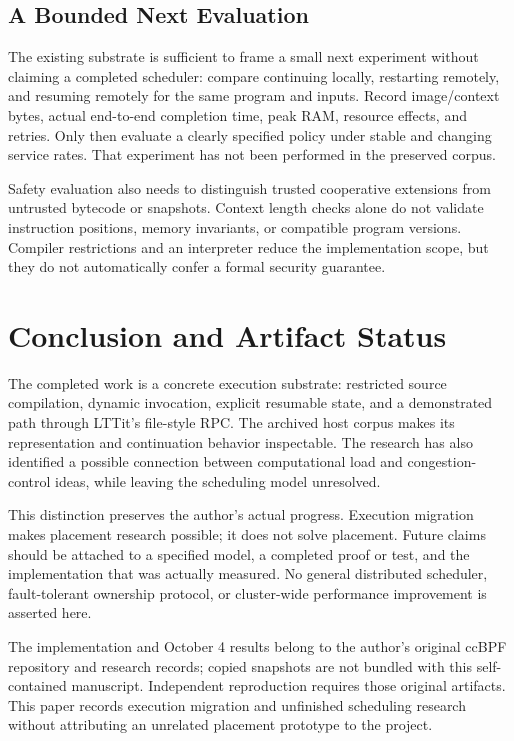 \documentclass[conference,letterpaper]{IEEEtran}
\begin{document}
\subsection{A Bounded Next Evaluation}
The existing substrate is sufficient to frame a small next experiment without claiming a completed scheduler: compare continuing locally, restarting remotely, and resuming remotely for the same program and inputs. Record image/context bytes, actual end-to-end completion time, peak RAM, resource effects, and retries. Only then evaluate a clearly specified policy under stable and changing service rates. That experiment has not been performed in the preserved corpus.

Safety evaluation also needs to distinguish trusted cooperative extensions from untrusted bytecode or snapshots. Context length checks alone do not validate instruction positions, memory invariants, or compatible program versions. Compiler restrictions and an interpreter reduce the implementation scope, but they do not automatically confer a formal security guarantee.

\section{Conclusion and Artifact Status}
The completed work is a concrete execution substrate: restricted source compilation, dynamic invocation, explicit resumable state, and a demonstrated path through LTTit's file-style RPC. The archived host corpus makes its representation and continuation behavior inspectable. The research has also identified a possible connection between computational load and congestion-control ideas, while leaving the scheduling model unresolved.

This distinction preserves the author's actual progress. Execution migration makes placement research possible; it does not solve placement. Future claims should be attached to a specified model, a completed proof or test, and the implementation that was actually measured. No general distributed scheduler, fault-tolerant ownership protocol, or cluster-wide performance improvement is asserted here.

The implementation and October 4 results belong to the author's original ccBPF repository and research records; copied snapshots are not bundled with this self-contained manuscript. Independent reproduction requires those original artifacts. This paper records execution migration and unfinished scheduling research without attributing an unrelated placement prototype to the project.
\end{document}
